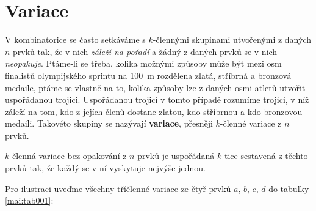     

  \section{Variace}\label{mai:IchapIVcsecII}
    V kombinatorice se často setkáváme s \(k\)-člennými skupinami utvořenými z daných \(n\) prvků
    tak, že v nich \emph{záleží na pořadí} a žádný z daných prvků se v nich \emph{neopakuje}.
    Ptáme-li se třeba, kolika možnými způsoby může být mezi osm finalistů olympijského sprintu na
    \SI{100}{\m} rozdělena zlatá, stříbrná a bronzová medaile, ptáme se vlastně na to, kolika
    způsoby lze z daných osmi atletů utvořit uspořádanou trojici. Uspořádanou trojicí v tomto
    případě rozumíme trojici, v níž záleží na tom, kdo z jejích členů dostane zlatou, kdo stříbrnou
    a kdo bronzovou medaili. Takovéto skupiny se nazývají \textbf{variace}, přesněji \(k\)-členné
    variace z \(n\) prvků.

    \begin{mdframed}[style=highlight] \(k\)-členná variace bez opakování z \(n\) prvků je uspořádaná
      \(k\)-tice sestavená z těchto prvků tak, že každý se v ní vyskytuje nejvýše jednou.
    \end{mdframed}
    
    Pro ilustraci uveďme všechny tříčlenné variace ze čtyř prvků \(a\), \(b\), \(c\), \(d\) do
    tabulky \ref{mai:tab001}:
    \begin{table}[ht!]      %
      \centering
      \caption{Tříčlenné variace ze čtyř prvků \(a\), \(b\), \(c\), \(d\)}
      \label{mai:tab001}
    \end{table}

